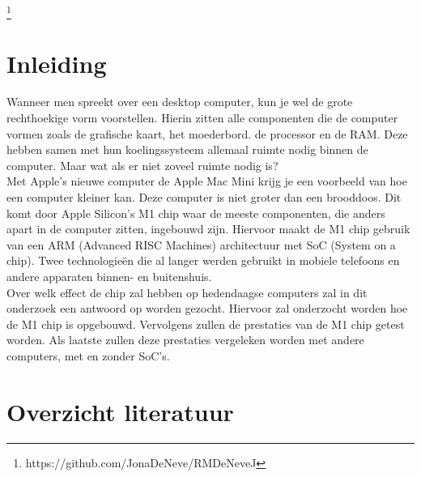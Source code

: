\documentclass{hogent-article}
\affiliation{
    \textsuperscript{1} \href{mailto:jona.deneve.@student.hogent.be}{jona.deneve.@student.hogent.be}
}
\newcommand\blfootnote[1]{%
    \begingroup
    \renewcommand\thefootnote{}\footnote{#1}%
    \addtocounter{footnote}{-1}%
    \endgroup
}
\begin{document}
\flushbottom %
\maketitle %
    \tableofcontents %
\thispagestyle{empty} %

\blfootnote{https://github.com/JonaDeNeve/RMDeNeveJ}


\section{Inleiding}


Wanneer men spreekt over een desktop computer, kun je wel de grote rechthoekige vorm voorstellen. Hierin zitten alle componenten die de computer vormen zoals de grafische kaart, het moederbord. de processor en de RAM. Deze hebben samen met hun koelingssysteem allemaal ruimte nodig binnen de computer. Maar wat als er niet zoveel ruimte nodig is? \\
Met Apple's nieuwe computer de Apple Mac Mini krijg je een voorbeeld van hoe een computer kleiner kan. Deze computer is niet groter dan een brooddoos. Dit komt door Apple Silicon's M1 chip waar de meeste componenten, die anders apart in de computer zitten, ingebouwd zijn. Hiervoor maakt de M1 chip gebruik van een ARM (Advanced RISC Machines) architectuur met SoC (System on a chip). Twee technologieën die al langer werden gebruikt in mobiele telefoons en andere apparaten binnen- en buitenshuis. \\
Over welk effect de chip zal hebben op hedendaagse computers zal in dit onderzoek een antwoord op worden gezocht. Hiervoor zal onderzocht worden hoe de M1 chip is opgebouwd. Vervolgens zullen de prestaties van de M1 chip getest worden. Als laatste zullen deze prestaties vergeleken worden met andere computers, met en zonder SoC's.

\section{Overzicht literatuur}
\end{document}
